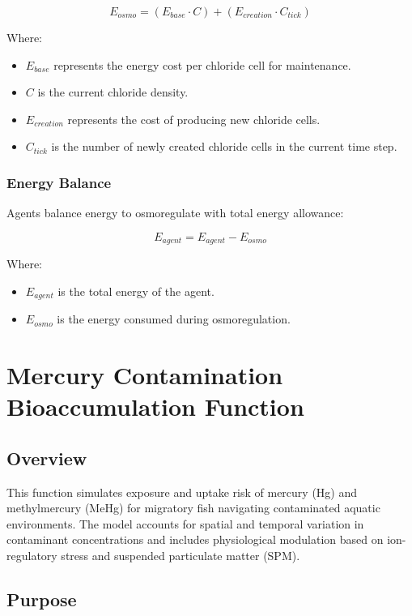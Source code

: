 \documentclass[
]{book}
\begin{document}
\[
E_{osmo} = (E_{base} \cdot C) + (E_{creation} \cdot C_{tick})
\]

Where:

\begin{itemize}
\item
  \(E_{base}\) represents the energy cost per chloride cell for maintenance.
\item
  \(C\) is the current chloride density.
\item
  \(E_{creation}\) represents the cost of producing new chloride cells.
\item
  \(C_{tick}\) is the number of newly created chloride cells in the current time step.
\end{itemize}

\subsection{Energy Balance}\label{energy-balance}

Agents balance energy to osmoregulate with total energy allowance:

\[
E_{agent} = E_{agent} - E_{osmo}
\]

Where:

\begin{itemize}
\item
  \(E_{agent}\) is the total energy of the agent.
\item
  \(E_{osmo}\) is the energy consumed during osmoregulation.
\end{itemize}

\chapter{Mercury Contamination Bioaccumulation Function}\label{mercury-contamination-bioaccumulation-function}

\section{Overview}\label{overview-2}

This function simulates exposure and uptake risk of mercury (Hg) and methylmercury (MeHg) for migratory fish navigating contaminated aquatic environments. The model accounts for spatial and temporal variation in contaminant concentrations and includes physiological modulation based on ion-regulatory stress and suspended particulate matter (SPM).

\section{Purpose}\label{purpose-1}
\end{document}
